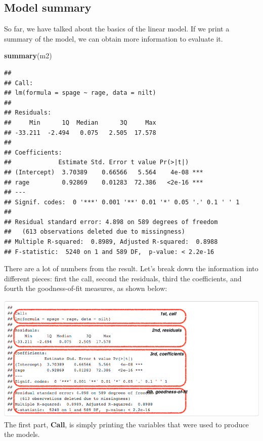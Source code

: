 \documentclass[
]{book}
\newenvironment{Shaded}{\begin{snugshade}}{\end{snugshade}}
\newcommand{\FunctionTok}[1]{\textcolor[rgb]{0.13,0.29,0.53}{\textbf{#1}}}
\newcommand{\NormalTok}[1]{#1}
\begin{document}
\hypertarget{model-summary}{%
\subsection{Model summary}\label{model-summary}}

So far, we have talked about the basics of the linear model. If we print a summary of the model, we can obtain more information to evaluate it.

\begin{Shaded}
\begin{Highlighting}[]
\FunctionTok{summary}\NormalTok{(m2)}
\end{Highlighting}
\end{Shaded}

\begin{verbatim}
## 
## Call:
## lm(formula = spage ~ rage, data = nilt)
## 
## Residuals:
##     Min      1Q  Median      3Q     Max 
## -33.211  -2.494   0.075   2.505  17.578 
## 
## Coefficients:
##             Estimate Std. Error t value Pr(>|t|)    
## (Intercept)  3.70389    0.66566   5.564    4e-08 ***
## rage         0.92869    0.01283  72.386   <2e-16 ***
## ---
## Signif. codes:  0 '***' 0.001 '**' 0.01 '*' 0.05 '.' 0.1 ' ' 1
## 
## Residual standard error: 4.898 on 589 degrees of freedom
##   (613 observations deleted due to missingness)
## Multiple R-squared:  0.8989, Adjusted R-squared:  0.8988 
## F-statistic:  5240 on 1 and 589 DF,  p-value: < 2.2e-16
\end{verbatim}

There are a lot of numbers from the result. Let's break down the information into different pieces: first the call, second the residuals, third the coefficients, and fourth the goodness-of-fit measures, as shown below:

\includegraphics{./images/r_studio_lab6_model_summary.png}
The first part, \textbf{Call}, is simply printing the variables that were used to produce the models.
\end{document}
